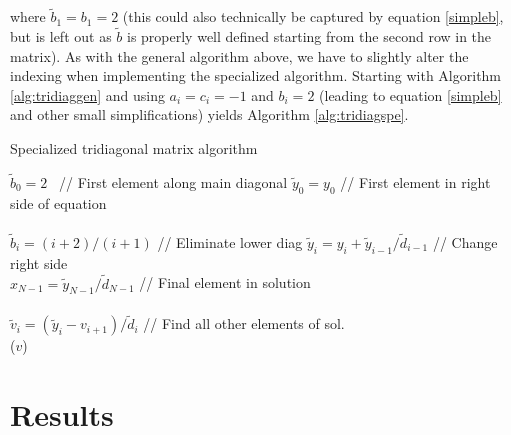 \documentclass[12pt]{article}
\numberwithin{figure}{section}
\numberwithin{table}{section}
\begin{document}
\noindent where $\tilde{b}_1=b_1=2$ (this could also technically be captured by equation \eqref{simpleb}, but is left out as $\tilde{b}$ is properly well defined starting from the second row in the matrix). As with the general algorithm above, we have to slightly alter the indexing when implementing the specialized algorithm. Starting with Algorithm \ref{alg:tridiaggen} and using $a_i=c_i=-1$ and $b_i=2$ (leading to equation \eqref{simpleb} and other small simplifications) yields Algorithm \ref{alg:tridiagspe}.
\pagebreak

\begin{algorithm}
\caption{Specialized tridiagonal matrix algorithm}\label{alg:tridiagspe}
\begin{algorithmic}[1]
	\State $\tilde{b}_0=2$ \ \qquad// First element along main diagonal
    \State $\tilde{y}_0=y_0$ \qquad// First element in right side of equation\\\\
    
		\State $\tilde{b}_i=(i+2)/(i+1)$						 \qquad// Eliminate lower diag
		\State $\tilde{y}_i=y_i+\tilde{y}_{i-1}/\tilde{d}_{i-1}$ \qquad// Change right side
	\EndFor \\
    
    \State $x_{N-1}=\tilde{y}_{N-1}/\tilde{d}_{N-1}$ \qquad\qquad// Final element in solution\\\\
    
		\State $\tilde{v}_i=(\tilde{y}_{i}-v_{i+1})/\tilde{d}_i$ \qquad // Find all other elements of sol.
	\EndFor \\
    
    \State \Return($v$)
\EndProcedure
\end{algorithmic}
\end{algorithm}





\section{Results}
\end{document}
